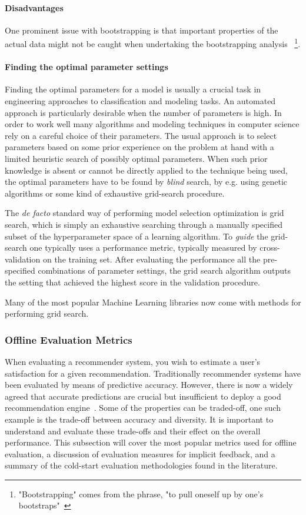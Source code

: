 \paragraph{Disadvantages}
	One prominent issue with bootstrapping is that important properties of the actual data might not be caught when undertaking the bootstrapping analysis
	~\footnote{"Bootstrapping" comes from the phrase, "to pull oneself up by one's bootstraps"~\cite{bootstrapSaying1843}}.


\paragraph{Finding the optimal parameter settings}

Finding the optimal parameters for a model is usually a crucial task in engineering approaches to classification and modeling tasks. An automated approach is particularly desirable when the number of parameters is high. In order to work well many algorithms and modeling techniques in computer science rely on a careful choice of their parameters. The usual approach is to select parameters based on some prior experience on the problem at hand with a limited heuristic search of possibly optimal parameters. When such prior knowledge is absent or cannot be directly applied to the technique being used, the optimal parameters have to be found by \emph{blind} search, by e.g. using genetic algorithms or some kind of exhaustive grid-search procedure.

The \emph{de facto} standard way of performing model selection optimization is grid search, which is simply an exhaustive searching through a manually specified subset of the hyperparameter space of a learning algorithm. To \emph{guide} the grid-search one typically uses a performance metric, typically measured by cross-validation on the training set. After evaluating the performance all the pre-specified combinations of parameter settings, the grid search algorithm outputs the setting that achieved the highest score in the validation procedure.

Many of the most popular Machine Learning libraries now come with methods for performing grid search.

\subsubsection{Offline Evaluation Metrics}

When evaluating a recommender system, you wish to estimate a user's
satisfaction for a given recommendation. Traditionally recommender systems have
been evaluated by means of predictive accuracy. However, there is now a widely
agreed that accurate predictions are crucial but insufficient to deploy a good
recommendation engine~\cite{Shani2011, McNee2006}. Some of the properties can
be traded-off, one such example is the trade-off between accuracy and
diversity. It is important to understand and evaluate these trade-offs and
their effect on the overall performance. This subsection will cover the most
popular metrics used for offline evaluation, a discussion of evaluation
measures for implicit feedback, and a summary of the cold-start evaluation
methodologies found in the literature.

